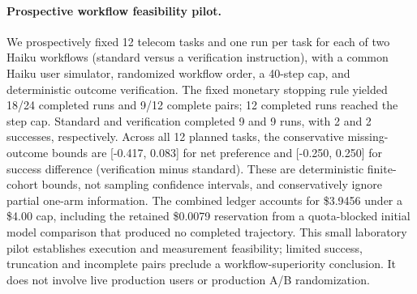 \paragraph{Prospective workflow feasibility pilot.} We prospectively fixed 12 telecom tasks and one run per task for each of two Haiku workflows (standard versus a verification instruction), with a common Haiku user simulator, randomized workflow order, a 40-step cap, and deterministic outcome verification. The fixed monetary stopping rule yielded 18/24 completed runs and 9/12 complete pairs; 12 completed runs reached the step cap. Standard and verification completed 9 and 9 runs, with 2 and 2 successes, respectively. Across all 12 planned tasks, the conservative missing-outcome bounds are [-0.417, 0.083] for net preference and [-0.250, 0.250] for success difference (verification minus standard). These are deterministic finite-cohort bounds, not sampling confidence intervals, and conservatively ignore partial one-arm information. The combined ledger accounts for \$3.9456 under a \$4.00 cap, including the retained \$0.0079 reservation from a quota-blocked initial model comparison that produced no completed trajectory. This small laboratory pilot establishes execution and measurement feasibility; limited success, truncation and incomplete pairs preclude a workflow-superiority conclusion. It does not involve live production users or production A/B randomization.

